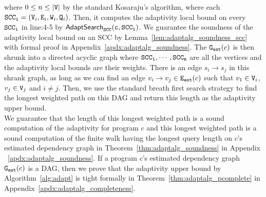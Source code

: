     where $0 \leq n \leq |\mathtt{V}|$ by the standard Kosaraju’s algorithm, where each
    $\mathtt{SCC_i} = (\mathtt{V}_i, \mathtt{E}_i, \mathtt{W}_i, \mathtt{Q}_i)$.
    Then, 
    it computes the adaptivity local bound on every $\mathtt{SCC_i}$
    in line:4-5 by $\mathtt{\mathsf{AdaptSearch}_{SCC}(c, SCC_i)}$.
    We guarantee the soundness of the adaptivity local bound on an SCC by Lemma~\ref{lem:adaptalg_soundness_scc} with formal proof in Appendix~\ref{apdx:adaptalg_soundness}.
    The $\mathtt{{G_{est}}}(c)$ is then shrunk into a directed acyclic graph where 
    $\mathtt{SCC_1}, \cdots, \mathtt{SCC_n}$ are all the vertices and the adaptivity local bounds are their weights.
    There is an edge $s_i \to s_j$ in this shrank graph, as long as we can find an edge $v_i \to v_j \in \mathtt{{E_{est}}}(c)$ such that $v_1 \in \mathtt{V}_i$, $v_j \in \mathtt{V}_j$ and $i \neq j$.
    Then, we use the standard breath first search strategy to find the longest weighted path
    on this DAG and return this length as the adaptivity upper bound.
    \\
    We guarantee that 
    the length of this longest weighted path is a sound computation of the adaptivity for program $c$
    and this longest weighted path is a sound computation of the finite walk having the longest query length 
    on $c$'s estimated dependency graph in Theorem~\ref{thm:adaptalg_soundness}
    in Appendix
    ~\ref{apdx:adaptalg_soundness}.
If a program
$c$'s estimated dependency graph $\mathtt{{G_{est}}}(c)$ is a DAG, then we prove that the adaptivity upper bound by Algorithm~\ref{alg:adapt} is tight formally in Theorem~\ref{thm:adaptalg_pcomplete} in Appendix~\ref{apdx:adaptalg_completeness}.

